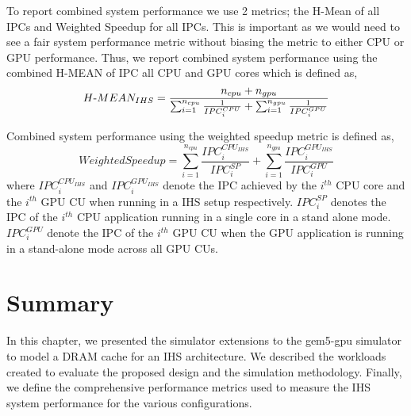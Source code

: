 \par To report combined system performance we use 2 metrics; the H-Mean of all IPCs and Weighted Speedup for all IPCs. This is important as we would need to see a fair system performance metric without biasing the metric to either CPU or GPU performance. Thus, we report combined system performance using the combined H-MEAN of IPC all CPU and GPU cores which is defined as,
{
\begin{equation*}
H\textnormal{-}MEAN_{IHS} = \frac{n_{cpu}+ n_{gpu}}{\sum_{i=1}^{n_{cpu}} \frac{1}{IPC_{i}^{CPU}} + \sum_{i=1}^{n_{gpu}} \frac{1}{IPC_{i}^{GPU}}} 
\end{equation*}
}
\par Combined system performance using the weighted speedup metric \cite{weighted-speedup} is defined as,
{
\begin{equation*}
Weighted Speedup = \sum_{i=1}^{n_{cpu}} \frac{IPC_i^{CPU_{IHS}}}{IPC_i^{SP}} + \sum_{i=1}^{n_{gpu}} \frac{IPC_i^{GPU_{IHS}}}{IPC_i^{GPU}}
\end{equation*}
}
where ${IPC_i^{CPU_{IHS}}}$ and $IPC_i^{GPU_{IHS}}$ denote the IPC achieved by the $i^{th}$ CPU core and the $i^{th}$ GPU CU when running in a IHS setup respectively. $IPC_i^{SP}$ denotes the IPC of the $i^{th}$ CPU application running in a single core in a stand alone mode. $IPC_i^{GPU}$ denote the IPC of the $i^{th}$ GPU CU when the GPU application is running in a stand-alone mode across all GPU CUs. 

\section{Summary}
In this chapter, we presented the simulator extensions to the gem5-gpu simulator to model a DRAM cache for an IHS architecture. We described the workloads created to evaluate the proposed design and the simulation methodology. Finally, we define the comprehensive performance metrics used to measure the IHS system performance for the various configurations.

